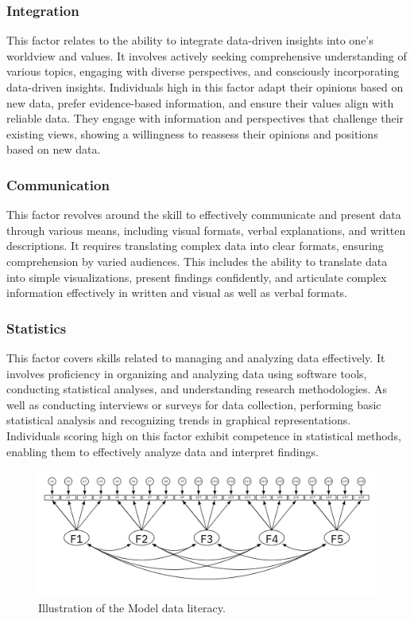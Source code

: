 \documentclass[
  12pt,
  a4paper,
  twoside]{article}
\begin{document}
\subsubsection{Integration}\label{integration}

This factor relates to the ability to integrate data-driven insights into one's worldview and values. It involves actively seeking comprehensive understanding of various topics, engaging with diverse perspectives, and consciously incorporating data-driven insights. Individuals high in this factor adapt their opinions based on new data, prefer evidence-based information, and ensure their values align with reliable data. They engage with information and perspectives that challenge their existing views, showing a willingness to reassess their opinions and positions based on new data.

\subsubsection{Communication}\label{communication}

This factor revolves around the skill to effectively communicate and present data through various means, including visual formats, verbal explanations, and written descriptions.
It requires translating complex data into clear formats, ensuring comprehension by varied audiences. This includes the ability to translate data into simple visualizations, present findings confidently, and articulate complex information effectively in written and visual as well as verbal formats.

\subsubsection{Statistics}\label{statistics}

This factor covers skills related to managing and analyzing data effectively. It involves proficiency in organizing and analyzing data using software tools, conducting statistical analyses, and understanding research methodologies.
As well as conducting interviews or surveys for data collection, performing basic statistical analysis and recognizing trends in graphical representations. Individuals scoring high on this factor exhibit competence in statistical methods, enabling them to effectively analyze data and interpret findings.

\begin{figure}

{\centering \includegraphics[width=1\linewidth]{images/Models_MA} 

}

\caption{Illustration of the Model data literacy.  }\label{fig:model1}
\end{figure}
\end{document}
